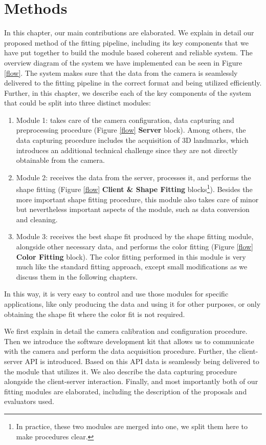 \chapter{Methods}\label{ch3}

In this chapter, our main contributions are elaborated. We explain in detail our proposed method of the fitting pipeline, including its key components that we have put together to build the module based coherent and reliable system. The overview diagram of the system we have implemented can be seen in Figure \ref{flow}. The system makes sure that the data from the camera is seamlessly delivered to the fitting pipeline in the correct format and being utilized efficiently. Further, in this chapter, we describe each of the key components of the system that could be split into three distinct modules:
\begin{enumerate}[$\bullet$]
    \item Module 1: takes care of the camera configuration, data capturing and preprocessing procedure (Figure \ref{flow} \textbf{Server} block). Among others, the data capturing procedure includes the acquisition of 3D landmarks, which introduces an additional technical challenge since they are not directly obtainable from the camera. 
    \item Module 2: receives the data from the server, processes it, and performs the shape fitting (Figure \ref{flow} \textbf{Client \& Shape Fitting} blocks\footnote{In practice, these two modules are merged into one, we split them here to make procedures clear.}). Besides the more important shape fitting procedure, this module also takes care of minor but nevertheless important aspects of the module, such as data conversion and cleaning.
    \item Module 3: receives the best shape fit produced by the shape fitting module, alongside other necessary data, and performs the color fitting (Figure \ref{flow} \textbf{Color Fitting} block). The color fitting performed in this module is very much like the standard fitting approach, except small modifications as we discuss them in the following chapters.
\end{enumerate}    

In this way, it is very easy to control and use those modules for specific applications, like only producing the data and using it for other purposes, or only obtaining the shape fit where the color fit is not required. \bigskip

We first explain in detail the camera calibration and configuration procedure. Then we introduce the software development kit that allows us to communicate with the camera and perform the data acquisition procedure. Further, the client-server API is introduced. Based on this API data is seamlessly being delivered to the module that utilizes it. We also describe the data capturing procedure alongside the client-server interaction. Finally, and most importantly both of our fitting modules are elaborated, including the description of the proposals and evaluators used.


